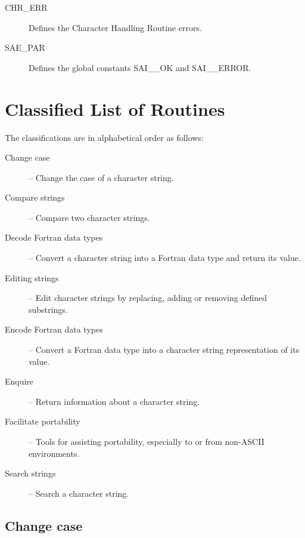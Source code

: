 \begin {description}
\item [CHR\_ERR] Defines the Character Handling Routine errors.
\item [SAE\_PAR] Defines the global constants SAI\_\_OK and SAI\_\_ERROR.
\end {description}

\newpage
\section {Classified List of Routines \label{class_sect}}

The classifications are in alphabetical order as follows:

\begin{description}
\item[Change case] --
    Change the case of a character string.
\item[Compare strings] --
    Compare two character strings.
\item[Decode Fortran data types] --
    Convert a character string into a Fortran data type and return its
    value.
\item[Editing strings] -- 
    Edit character strings by replacing, adding or removing defined 
    substrings.
\item[Encode Fortran data types] --
    Convert a Fortran data type into a character string representation of
    its value.
\item[Enquire] --
    Return information about a character string.
\item[Facilitate portability] --
    Tools for assisting portability, especially to or from non-ASCII
    environments.
\item[Search strings] --
    Search a character string.
\end{description}


\subsection {Change case}

